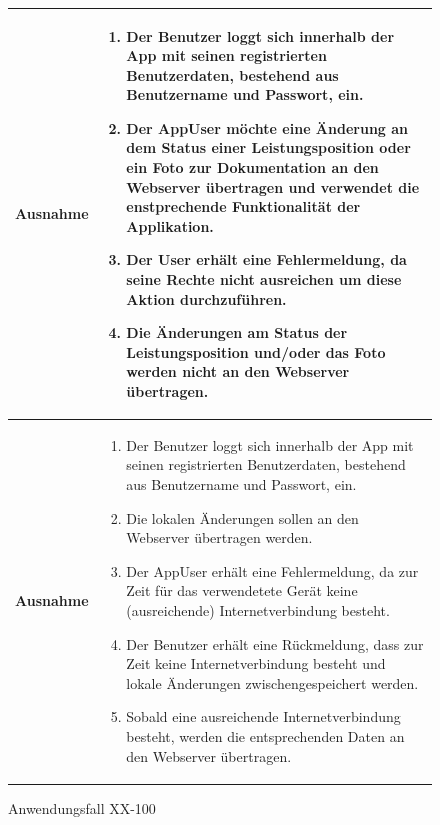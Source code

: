 			\begin{figure}[h]
	\centering
	\begin{tabularx}{\textwidth}{ X | X }
		\textbf{Ausnahme} &
				\begin{enumerate}
				\item Der Benutzer loggt sich innerhalb der App mit seinen registrierten Benutzerdaten, bestehend aus Benutzername und Passwort,  ein.  
					 \item Der AppUser m\"ochte eine \"Anderung an dem Status einer Leistungsposition oder ein Foto zur Dokumentation an den Webserver \"ubertragen und verwendet die enstprechende Funktionalit\"at der Applikation.
					 \item Der User erh\"alt eine Fehlermeldung, da seine Rechte nicht ausreichen um diese Aktion durchzuf\"uhren.
					 \item Die \"Anderungen am Status der Leistungsposition und/oder das Foto werden nicht an den Webserver \"ubertragen.
					 \end{enumerate} \\ \hline
					 	\textbf{Ausnahme} &
				\begin{enumerate}
					\item Der Benutzer loggt sich innerhalb der App mit seinen registrierten Benutzerdaten, bestehend aus Benutzername und Passwort,  ein.  
					\item Die lokalen \"Anderungen sollen an den Webserver \"ubertragen werden.
					\item Der AppUser erh\"alt eine Fehlermeldung,  da zur Zeit f\"ur das verwendetete Ger\"at keine (ausreichende) Internetverbindung besteht. 
					\item Der Benutzer erh\"alt eine R\"uckmeldung,  dass zur Zeit keine Internetverbindung besteht und lokale \"Anderungen zwischengespeichert werden.
					\item Sobald eine ausreichende Internetverbindung besteht,  werden die entsprechenden Daten an den Webserver \"ubertragen.
				\end{enumerate} 
				 	\end{tabularx}
	\caption{Anwendungsfall XX-100}
	\label{fig:anwendungsfall-app-tabelle-xx-3}
\end{figure}
